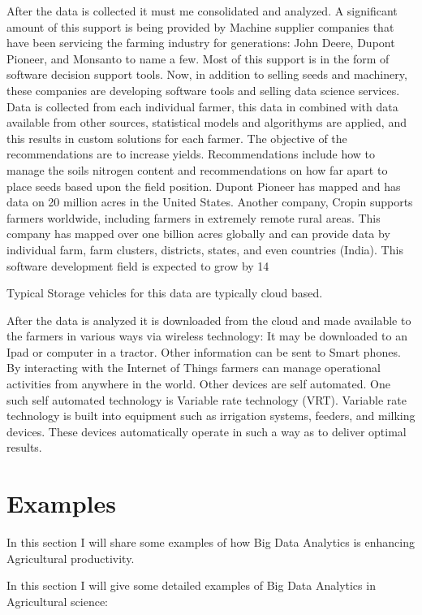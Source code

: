 \documentclass[sigconf]{acmart}
\begin{document}
After the data is collected it must me consolidated and analyzed. A significant amount of this support is being provided by Machine supplier companies that have been servicing the farming industry for generations: John Deere, Dupont Pioneer, and Monsanto to name a few. Most of this support is in the form of software decision support tools. Now, in addition to selling seeds and machinery, these companies are developing software tools and selling data science services. Data is collected from each individual farmer, this data in combined with data available from other sources, statistical models and algorithyms are applied, and this results in custom solutions for each farmer. The objective of the recommendations are to increase yields. Recommendations include how to manage the soils nitrogen content and recommendations on how far apart to place seeds based upon the field position. Dupont Pioneer has mapped and has data on 20 million acres in the United States. Another company, Cropin supports farmers worldwide, including farmers in extremely remote rural areas. This company has mapped over one billion acres globally and can provide data by individual farm, farm clusters, districts, states, and even countries (India). This software development field is expected to grow by 14%

Typical Storage vehicles for this data are typically cloud based. 

After the data is analyzed it is downloaded from the cloud and made available to the farmers in various ways via wireless technology:
It may be downloaded to an Ipad or computer in a tractor. Other information can be sent to Smart phones. By interacting with the Internet of Things farmers can manage operational activities from anywhere in the world. Other devices are self automated. One such self automated technology is Variable rate technology (VRT). Variable rate technology is built into equipment such as irrigation systems, feeders, and milking devices. These devices automatically operate in such a way as to deliver optimal results.

\section {Examples}

In this section I will share some examples of how Big Data Analytics is enhancing Agricultural productivity.

In this section I will give some detailed examples of Big Data Analytics in Agricultural science:
\end{document}
